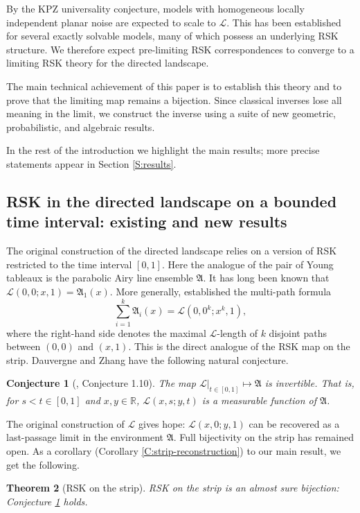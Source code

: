 \documentclass[11pt]{article}
\newtheorem{theorem}{Theorem}[section]
\newtheorem{conjecture}[theorem]{Conjecture}
\theoremstyle{definition} %
\theoremstyle{remark} %
\begin{document}
By the KPZ universality conjecture, models with homogeneous locally independent planar noise are expected to scale to \(\mathcal{L}\). This has been established for several exactly solvable models, many of which possess an underlying RSK structure. We therefore expect pre-limiting RSK correspondences to converge to a limiting RSK theory for the directed landscape. 

The main technical achievement of this paper is to establish this theory and to prove that the limiting map remains a bijection. Since classical inverses lose all meaning in the limit, we construct the inverse using a suite of new geometric, probabilistic, and algebraic results.

In the rest of the introduction we highlight the main results; more precise statements appear in Section \ref{S:results}.

\subsection{RSK in the directed landscape on a bounded time interval: existing and new results}

The original construction of the directed landscape relies on a version of RSK restricted to the time interval \([0,1]\). Here the analogue of the pair of Young tableaux is the parabolic Airy line ensemble \(\mathfrak{A}\). It has long been known that \(\mathcal{L}(0,0;x,1)=\mathfrak{A}_1(x)\). More generally, \cite{dauvergne2021disjoint} established the multi-path formula
\[
\sum_{i=1}^k \mathfrak{A}_i(x)=\mathcal{L}(0,0^k;x^k,1),
\]
where the right-hand side denotes the maximal $\mathcal L$-length of $k$ disjoint paths between $(0,0)$ and $(x,1)$.
This is the direct analogue of the RSK map on the strip. Dauvergne and Zhang have the following natural conjecture.
\begin{conjecture}[\cite{dauvergne2021disjoint}, Conjecture 1.10]\label{c:1}
The map $\mathcal L|_{t\in[0,1]}\mapsto \mathfrak A$ is invertible. 
That is, for \(s<t\in[0,1]\) and \(x,y\in\mathbb{R}\), \(\mathcal{L}(x,s;y,t)\) is a measurable function of \(\mathfrak{A}\).
\end{conjecture}

The original construction of $\mathcal L$ gives hope: \(\mathcal{L}(x,0;y,1)\) can be recovered as a last-passage limit in the environment  \(\mathfrak{A}\). Full bijectivity on the strip has remained open. As a corollary (Corollary \ref{C:strip-reconstruction}) to our main result, we get the following.
\begin{theorem}[RSK on the strip]
\label{T:Airy-RSK-intro}
RSK on the strip is an almost sure bijection: Conjecture \ref{c:1} holds.  \end{theorem}
\end{document}
